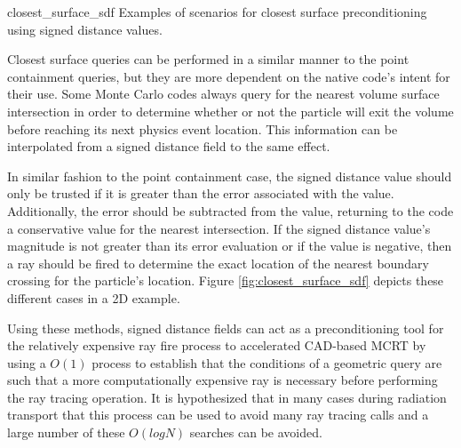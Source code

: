              {closest_surface_sdf}
             {Examples of scenarios for closest surface preconditioning using signed distance values.}
             {
               Closest surface queries can be performed in a similar manner to
               the point containment queries, but they are more dependent on the
               native code's intent for their use. Some Monte Carlo codes always
               query for the nearest volume surface intersection in order to
               determine whether or not the particle will exit the volume before
               reaching its next physics event location. This information can be
               interpolated from a signed distance field to the same effect.
               
               In similar fashion to the point containment case, the signed
               distance value should only be trusted if it is greater than the
               error associated with the value. Additionally, the error should
               be subtracted from the value, returning to the code a
               conservative value for the nearest intersection. If the signed
               distance value's magnitude is not greater than its error
               evaluation or if the value is negative, then a ray should be
               fired to determine the exact location of the nearest boundary
               crossing for the particle's location. Figure
               \ref{fig:closest_surface_sdf} depicts these different cases in a
               2D example.
             }


Using these methods, signed distance fields can act as a preconditioning tool
for the relatively expensive ray fire process to accelerated CAD-based MCRT by
using a $O(1)$ process to establish that the conditions of a geometric query are
such that a more computationally expensive ray is necessary before performing
the ray tracing operation. It is hypothesized that in many cases during
radiation transport that this process can be used to avoid many ray tracing
calls and a large number of these $O(logN)$ searches can be avoided.

